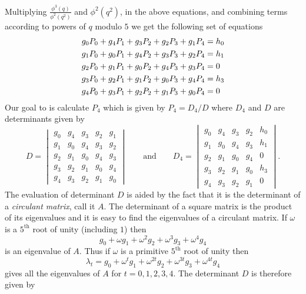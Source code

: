 \documentclass{article}
\begin{document}
\smallskip
\noindent
Multiplying $\frac{\phi^3(q)}{\phi^2(q^2)}$ and $\phi^2(q^2)$, in the above equations, and combining terms according to powers of $q$ modulo $5$ we get the following set of equations
\begin{align}
g_{0}P_{0} + g_{4}P_{1} + g_{3}P_{2} + g_{2}P_{3} + g_{1}P_{4} &= h_0\notag\\
g_{1}P_{0} + g_{0}P_{1} + g_{4}P_{2} + g_{3}P_{3} + g_{2}P_{4} &= h_1\notag\\
g_{2}P_{0} + g_{1}P_{1} + g_{0}P_{2} + g_{4}P_{3} + g_{3}P_{4} &= 0\notag\\
g_{3}P_{0} + g_{2}P_{1} + g_{1}P_{2} + g_{0}P_{3} + g_{4}P_{4} &= h_3\notag\\
g_{4}P_{0} + g_{3}P_{1} + g_{2}P_{2} + g_{1}P_{3} + g_{0}P_{4} &= 0\notag
\end{align}
Our goal to is calculate $P_{4}$ which is given by $P_{4} = D_{4}/D$ where $D_{4}$ and $D$ are determinants given by
$$D = \begin{vmatrix}
g_{0} & g_{4} & g_{3} & g_{2} & g_{1}\\ 
g_{1} & g_{0} & g_{4} & g_{3} & g_{2}\\ 
g_{2} & g_{1} & g_{0} & g_{4} & g_{3}\\ 
g_{3} & g_{2} & g_{1} & g_{0} & g_{4}\\ 
g_{4} & g_{3} & g_{2} & g_{1} & g_{0}\end{vmatrix} \qquad \text{and} \qquad 
D_4 = \begin{vmatrix}g_{0} & g_{4} & g_{3} & g_{2} & h_0\\ 
g_{1} & g_{0} & g_{4} & g_{3} & h_1\\ 
g_{2} & g_{1} & g_{0} & g_{4} & 0 \\ 
g_{3} & g_{2} & g_{1} & g_{0} & h_3 \\ 
g_{4} & g_{3} & g_{2} & g_{1} & 0\end{vmatrix}.$$
The evaluation of determinant $D$ is aided by the fact that it is the determinant of a \emph{circulant matrix}, call it $A$. The determinant of a square matrix is the product of its eigenvalues and it is easy to find the eigenvalues of a circulant matrix. If $\omega$ is a $5^{\text{th}}$ root of unity (including $1$) then 
$$g_{0} + \omega g_{1} + \omega^{2}g_{2} + \omega^{3}g_{3} + \omega^{4}g_{4}$$ 
is an eigenvalue of $A$. Thus if $\omega$ is a primitive $5^{\text{th}}$ root of unity then 
$$\lambda_{t} = g_{0} + \omega^{t} g_{1} + \omega^{2t}g_{2} + \omega^{3t}g_{3} + \omega^{4t}g_{4}$$ 
gives all the eigenvalues of $A$ for $t = 0, 1, 2, 3, 4$. The determinant $D$ is therefore given by 
\end{document}
